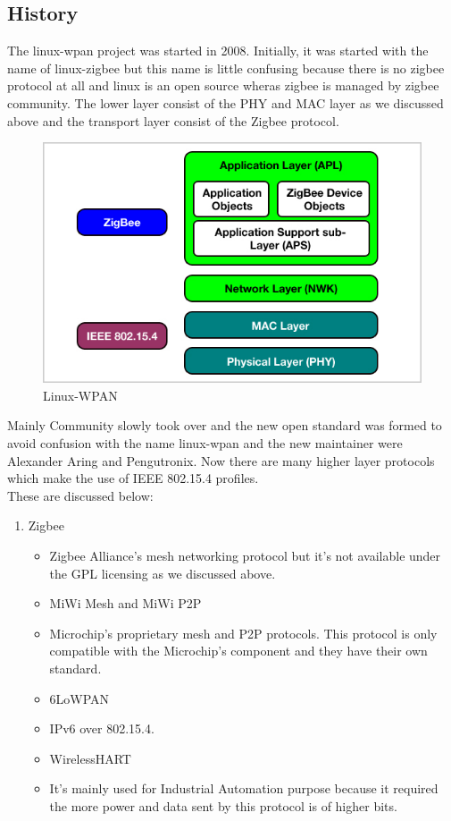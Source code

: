 \subsection{History}
The linux-wpan project was started in 2008. Initially, it was started with the name of linux-zigbee but this name is little confusing because there is no zigbee protocol at all and  linux is an open source wheras zigbee is managed by zigbee community. The lower layer consist of the PHY and MAC layer as we discussed above and the transport layer consist of the Zigbee protocol.
\begin{figure}[ht]
	\centering
	\includegraphics[scale=0.8]{images/wpan.png}
	\caption{Linux-WPAN}
\end{figure}
Mainly Community slowly took over and the new open standard was formed to avoid confusion with the name linux-wpan and the new maintainer were Alexander Aring and Pengutronix. Now there are many higher layer protocols which make the use of IEEE 802.15.4 profiles.\\
These are discussed below:\\
\begin{enumerate}
	\item{Zigbee}
	\begin{itemize}
		\item Zigbee Alliance's mesh networking protocol but it’s not available under the GPL licensing as we discussed above.
	\item{MiWi Mesh and MiWi P2P}
		\item Microchip's proprietary mesh and P2P protocols. This protocol is only compatible with the Microchip’s component and they have their own standard.
	\item{6LoWPAN}
		\item IPv6 over 802.15.4.
	\item{WirelessHART}
		\item It’s mainly used for Industrial Automation purpose because it required the more power and data sent by this protocol is of higher bits.
	\end{itemize}
\end{enumerate}
